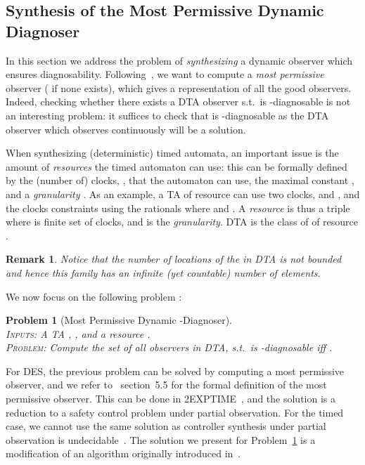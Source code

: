 \documentclass[letterpaper,10pt,conference]{ieeeconf}  \IEEEoverridecommandlockouts                              \overrideIEEEmargins
\def\st{{s.t.}~}
\newtheorem{prob}{Problem}  \newtheorem{definition}{Definition}
\newtheorem{remark}{Remark}
\def\dtamu{DTA\xspace}
\begin{document}
\subsection{Synthesis of the Most Permissive Dynamic Diagnoser}
In this section we address the problem of \emph{synthesizing} a \dta
dynamic observer which ensures
diagnosability. Following~\cite{cassez-fi-08}, we want to compute a
\emph{most permissive} observer ( if none exists), which
gives a representation of all the good observers.  Indeed, checking
whether there exists a DTA observer  \st  is
-diagnosable is not an interesting problem: it suffices to check
that  is -diagnosable as the DTA observer which observes
 continuously will be a solution.


When synthesizing (deterministic) timed automata, an important issue
is the amount of \emph{resources} the timed automaton can use: this
can be formally defined~\cite{BDMP-cav-2003} by the (number of) clocks, ,
that the automaton can use, the maximal constant , and a
\emph{granularity} . As an example, a TA of resource
 can use two clocks,  and , and the
clocks constraints using the rationals  where  and .  A \emph{resource}  is thus a triple
 where  is finite set of clocks,  and  is the \emph{granularity}.
\dtamu is the class of \dta of resource .
\begin{remark}
  Notice that the number of locations of the \dta in \dtamu is not
  bounded and hence this family has an infinite (yet countable) number
  of elements.
\end{remark}

We now focus on the following problem :
\begin{prob}[Most Permissive Dynamic -Diagnoser] \label{prob-dynamic-synth} \mbox{} \\
  \textsc{Inputs:} A TA ,
  ,
  and a resource .\\
  \textsc{Problem:} Compute the set  of all observers in \dtamu,
  \st  is -diagnosable iff .
\end{prob}
For DES, the previous problem can be solved by computing a most
permissive observer, and we refer to~\cite{cassez-fi-08} section~5.5
for the formal definition of the most permissive observer. This can be
done in 2EXPTIME~\cite{cassez-fi-08}, and the solution is a reduction
to a safety control problem under partial observation.  For the timed
case, we cannot use the same solution as controller synthesis under
partial observation is undecidable~\cite{BDMP-cav-2003}.  The solution
we present for Problem~\ref{prob-dynamic-synth} is a modification of
an algorithm originally introduced in~\cite{Bouyerfossacs05}. 
\end{document}
